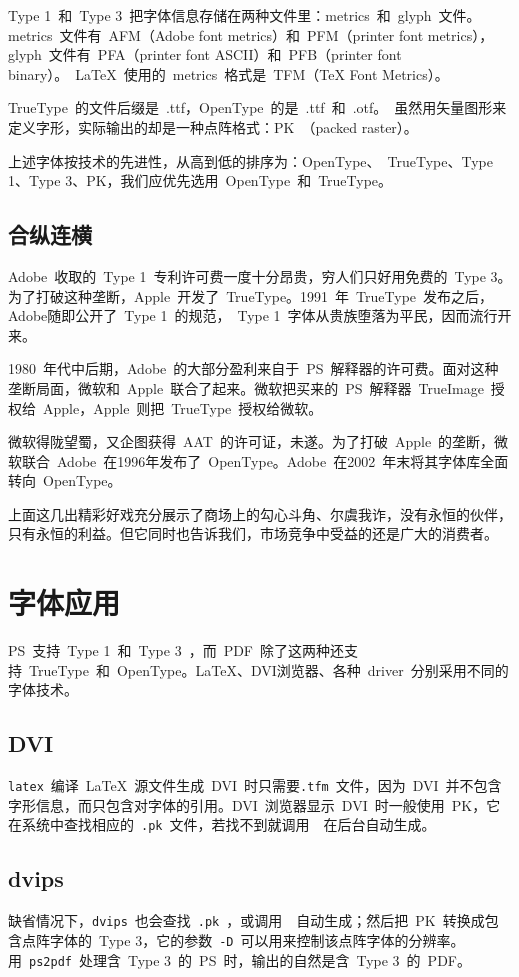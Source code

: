 Type 1~和~Type
3~把字体信息存储在两种文件里：metrics~和~glyph~文件。metrics~文件有~AFM（Adobe font metrics）和~PFM（printer font metrics），glyph~文件有~PFA（printer font ASCII）和~PFB（printer font binary）。~\LaTeX{}~使用的~metrics~格式是~TFM（TeX Font Metrics）。

TrueType~的文件后缀是~.ttf，OpenType~的是~.ttf~和~.otf。\MF~虽然用矢量图形来定义字形，实际输出的却是一种点阵格式：PK~（packed raster）。

上述字体按技术的先进性，从高到低的排序为：OpenType、~TrueType、Type 1、Type 3、PK，我们应优先选用~OpenType~和~TrueType。

\subsection{合纵连横}
Adobe~收取的~Type 1~专利许可费一度十分昂贵，穷人们只好用免费的~Type 3。为了打破这种垄断，Apple~开发了~TrueType。1991~年~TrueType~发布之后，Adobe随即公开了~Type 1~的规范，~Type 1~字体从贵族堕落为平民，因而流行开来。

1980~年代中后期，Adobe~的大部分盈利来自于~PS~解释器的许可费。面对这种垄断局面，微软和~Apple~联合了起来。微软把买来的~PS~解释器~TrueImage~授权给~Apple，Apple~则把~TrueType~授权给微软。

微软得陇望蜀，又企图获得~AAT~的许可证，未遂。为了打破~Apple~的垄断，微软联合~Adobe~在1996年发布了~OpenType。Adobe~在2002~年末将其字体库全面转向~OpenType。

上面这几出精彩好戏充分展示了商场上的勾心斗角、尔虞我诈，没有永恒的伙伴，只有永恒的利益。但它同时也告诉我们，市场竞争中受益的还是广大的消费者。

\section{字体应用}

PS~支持~Type 1~和~Type 3~，而~PDF~除了这两种还支持~TrueType~和~OpenType。\LaTeX{}、DVI浏览器、各种~driver~分别采用不同的字体技术。

\subsection{DVI}
\verb|latex|~编译~\LaTeX{}~源文件生成~DVI~时只需要\verb|.tfm|~文件，因为~DVI~并不包含字形信息，而只包含对字体的引用。DVI~浏览器显示~DVI~时一般使用~PK，它在系统中查找相应的~\verb|.pk|~文件，若找不到就调用~\MF~在后台自动生成。

\subsection{dvips}
缺省情况下，\verb|dvips|~也会查找~\verb|.pk|~，或调用~\MF~自动生成；然后把~PK~转换成包含点阵字体的~Type 3，它的参数~\verb|-D|~可以用来控制该点阵字体的分辨率。用~\verb|ps2pdf|~处理含~Type 3~的~PS~时，输出的自然是含~Type 3~的~PDF。

